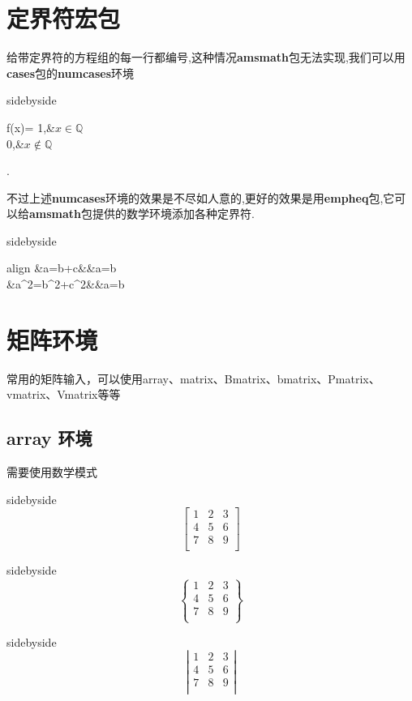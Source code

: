 \documentclass[cn,chinese,color=cyan]{elegantbook}
\begin{document}
\section{定界符宏包}
给带定界符的方程组的每一行都编号,这种情况\textbf{amsmath}包无法实现,我们可以用\textbf{cases}包的\textbf{numcases}环境
\begin{tcblisting}{sidebyside}
\begin{numcases}{f(x)=}%
1,&$x\in\mathbb Q$\\
0,&$x\notin\mathbb Q$
\end{numcases}.
\end{tcblisting}
不过上述\textbf{numcases}环境的效果是不尽如人意的,更好的效果是用\textbf{empheq}包,它可以给\textbf{amsmath}包提供的数学环境添加各种定界符.
\begin{tcblisting}{sidebyside}
\begin{empheq}[left=\empheqlbrace,
right=\empheqrbrack]{align}
&a=b+c&&a=b\\
&a^2=b^2+c^2&&a=b
\end{empheq}
\end{tcblisting}

\section{矩阵环境}
常用的矩阵输入，可以使用array、matrix、Bmatrix、bmatrix、Pmatrix、vmatrix、Vmatrix等等
\subsection{array 环境}
需要使用数学模式
\begin{tcblisting}{sidebyside}
$$\left[
\begin{array}{ccc}
1&2&3 \\4&5&6 \\7&8&9 \\
\end{array}
\right]$$
\end{tcblisting}

\begin{tcblisting}{sidebyside}
$$
\left\{
\begin{array}{ccc}
1&2&3 \\
4&5&6 \\
7&8&9 \\
\end{array}
\right\}
$$
\end{tcblisting}

\begin{tcblisting}{sidebyside}
$$
\left|
\begin{array}{ccc}
1&2&3 \\
4&5&6 \\
7&8&9 \\
\end{array}
\right|
$$
\end{tcblisting}
\end{document}
